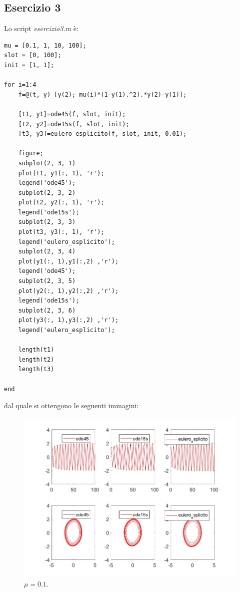 \documentclass[11pt,a4paper,twoside,openright,titlepage,
headinclude,footinclude,BCOR5mm,
numbers=noenddot,cleardoublepage=empty,
tablecaptionabove]{scrbook}
\begin{document}
\subsection{Esercizio 3}
Lo script \emph{esercizio3.m} è:
\begin{lstlisting}[frame = trBL]
mu = [0.1, 1, 10, 100];
slot = [0, 100];
init = [1, 1];

for i=1:4
    f=@(t, y) [y(2); mu(i)*(1-y(1).^2).*y(2)-y(1)];
    
    [t1, y1]=ode45(f, slot, init);
    [t2, y2]=ode15s(f, slot, init);
    [t3, y3]=eulero_esplicito(f, slot, init, 0.01);
    
    figure;
    subplot(2, 3, 1)
    plot(t1, y1(:, 1), 'r');
    legend('ode45');
    subplot(2, 3, 2)
    plot(t2, y2(:, 1), 'r');
    legend('ode15s');
    subplot(2, 3, 3)
    plot(t3, y3(:, 1), 'r');
    legend('eulero_esplicito');
    subplot(2, 3, 4)
    plot(y1(:, 1),y1(:,2) ,'r');
    legend('ode45');
    subplot(2, 3, 5)
    plot(y2(:, 1),y2(:,2) ,'r');
    legend('ode15s');
    subplot(2, 3, 6)
    plot(y3(:, 1),y3(:,2) ,'r');
    legend('eulero_esplicito');
    
    length(t1)
    length(t2)
    length(t3)

end
\end{lstlisting}
dal quale si ottengono le seguenti immagini:
\begin{center}
\begin{figure}[h!]
\includegraphics[width=\textwidth]{figs/esercizio3_1.jpg}
\caption{$\mu = 0.1$.}
\end{figure}
\end{center}
\end{document}
